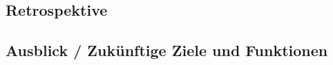 \subsection{Retrospektive}\label{subsec:Retrospektive}

\subsection{Ausblick / Zukünftige Ziele und Funktionen}\label{subsec:ausblick-zukuenftige-ziele-und-funktionen}